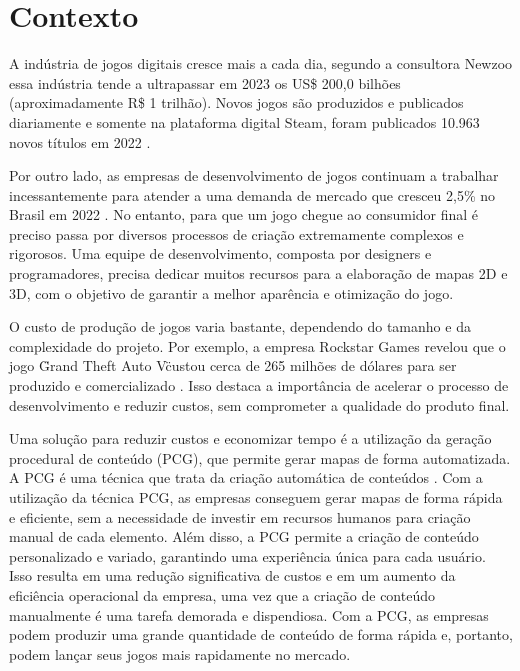 \documentclass[
	12pt,				%
	openright,			%
	twoside,			%
	a4paper,			%
	english,			%
	french,				%
	spanish,			%
	brazil				%
	]{abntex2}
\begin{document}
\section{Contexto}

A indústria de jogos digitais cresce mais a cada dia, segundo a consultora Newzoo \space\cite{quanto_games_vao_movimentar} essa indústria tende a ultrapassar em 2023 os US\$ 200,0 bilhões (aproximadamente R\$ 1 trilhão). Novos jogos são produzidos e publicados diariamente e somente na plataforma digital Steam, foram publicados 10.963 novos títulos em 2022\space
\cite{numero_de_jogos_publicados_na_steam}.

Por outro lado, as empresas de desenvolvimento de jogos continuam a trabalhar incessantemente para atender a uma demanda de mercado que cresceu 2,5\% no Brasil em 2022 
\space
\cite{pesquisa_games_brasil}. No entanto, para que um jogo chegue ao consumidor final é preciso passa por diversos processos de criação extremamente complexos e rigorosos. Uma equipe de desenvolvimento, composta por designers e programadores, precisa dedicar muitos recursos para a elaboração de mapas 2D e 3D, com o objetivo de garantir a melhor aparência e otimização do jogo.

O custo de produção de jogos varia bastante, dependendo do tamanho e da complexidade do projeto. Por exemplo, a empresa Rockstar Games revelou que o jogo \"Grand Theft Auto V\" custou cerca de 265 milhões de dólares para ser produzido e comercializado \space
\cite{gta_quanto_custou}. Isso destaca a importância de acelerar o processo de desenvolvimento e reduzir custos, sem comprometer a qualidade do produto final.

Uma solução para reduzir custos e economizar tempo é a utilização da geração procedural de conteúdo (PCG), que permite gerar mapas de forma automatizada. A PCG é uma técnica que trata da criação automática de conteúdos \space
\cite{geracao_procedural_conteudo}. Com a utilização da técnica PCG, as empresas conseguem gerar mapas de forma rápida e eficiente, sem a necessidade de investir em recursos humanos para criação manual de cada elemento. Além disso, a PCG permite a criação de conteúdo personalizado e variado, garantindo uma experiência única para cada usuário. Isso resulta em uma redução significativa de custos e em um aumento da eficiência operacional da empresa, uma vez que a criação de conteúdo manualmente é uma tarefa demorada e dispendiosa. Com a PCG, as empresas podem produzir uma grande quantidade de conteúdo de forma rápida e, portanto, podem lançar seus jogos mais rapidamente no mercado.
\end{document}
